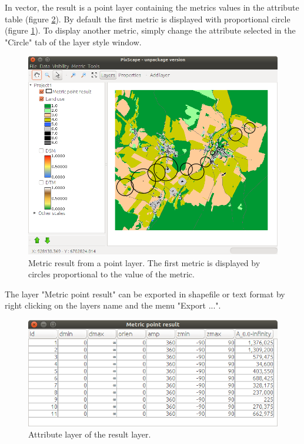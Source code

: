\documentclass{report}
\begin{document}
In vector, the result is a point layer containing the metrics values in the attribute table (figure \ref{metric_result_attr}). By default the first metric is displayed with proportional circle (figure \ref{metric_result_vect}). To display another metric, simply change the attribute selected in the "Circle" tab of the layer style window.

\begin{figure}[H]
	\includegraphics[scale=0.5]{img/metric_result_vect-en.png} 
	\caption{Metric result from a point layer. The first metric is displayed by circles proportional to the value of the metric.}
	\label{metric_result_vect}
\end{figure}

The layer "Metric point result" can be exported in shapefile or text format by right clicking on the layers name and the menu "Export ...".

\begin{figure}[H]
	\includegraphics[scale=0.5]{img/metric_result_attr-en.png} 
	\caption{Attribute layer of the result layer.}
	\label{metric_result_attr}
\end{figure}
\end{document}
